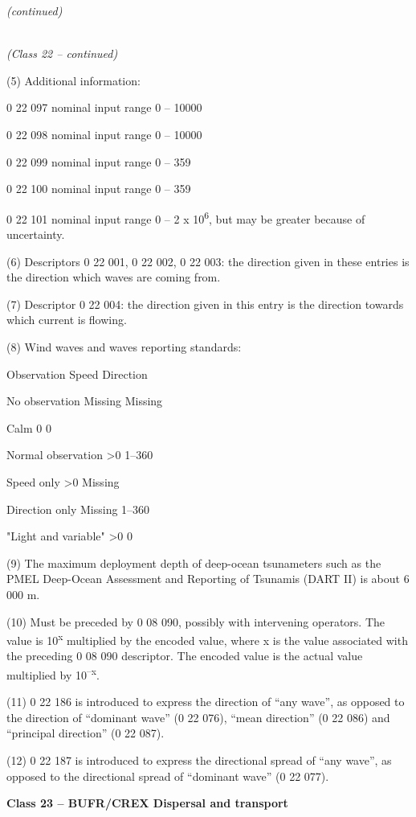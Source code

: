 \emph{(continued)}

\emph{\\
(Class 22 -- continued)}

(5) Additional information:

0 22 097 nominal input range 0 -- 10000

0 22 098 nominal input range 0 -- 10000

0 22 099 nominal input range 0 -- 359

0 22 100 nominal input range 0 -- 359

0 22 101 nominal input range 0 -- 2 x 10\textsuperscript{6}, but may be greater because of uncertainty.

(6) Descriptors 0 22 001, 0 22 002, 0 22 003: the direction given in these entries is the direction which waves are coming from.

(7) Descriptor 0 22 004: the direction given in this entry is the direction towards which current is flowing.

(8) Wind waves and waves reporting standards:

Observation Speed Direction

No observation Missing Missing

Calm 0 0

Normal observation \textgreater0 1--360

Speed only \textgreater0 Missing

Direction only Missing 1--360

"Light and variable" \textgreater0 0

(9) The maximum deployment depth of deep-ocean tsunameters such as the PMEL Deep-Ocean Assessment and Reporting of Tsunamis (DART II) is about 6 000 m.

(10) Must be preceded by 0 08 090, possibly with intervening operators. The value is 10\textsuperscript{x} multiplied by the encoded value, where x is the value associated with the preceding 0 08 090 descriptor. The encoded value is the actual value multiplied by 10\textsuperscript{--x}.

(11) 0 22 186 is introduced to express the direction of ``any wave'', as opposed to the direction of ``dominant wave'' (0 22 076), ``mean direction'' (0 22 086) and ``principal direction'' (0 22 087).

(12) 0 22 187 is introduced to express the directional spread of ``any wave'', as opposed to the directional spread of ``dominant wave'' (0 22 077).

\textbf{Class 23 -- BUFR/CREX Dispersal and transport}

